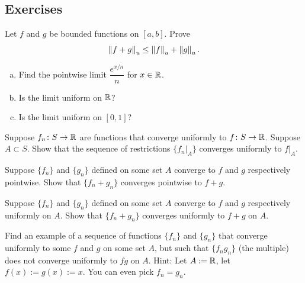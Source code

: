 \subsection{Exercises}

\begin{exercise}
Let $f$ and $g$ be bounded functions on $[a,b]$.  Prove 
\begin{equation*}
\left\lVert {f+g} \right\rVert_u \leq \left\lVert {f} \right\rVert_u + \left\lVert {g} \right\rVert_u .
\end{equation*}
\end{exercise}

\begin{samepage}
\begin{exercise}
\leavevmode
\begin{enumerate}[a)]
\item
Find the pointwise limit $\dfrac{e^{x/n}}{n}$ for $x \in {\mathbb{R}}$.
\item
Is the limit uniform on ${\mathbb{R}}$?
\item
Is the limit uniform on $[0,1]$?
\end{enumerate}
\end{exercise}
\end{samepage}

\begin{exercise}
Suppose $f_n \colon S \to {\mathbb{R}}$ are functions that converge uniformly
to $f \colon S \to {\mathbb{R}}$.  Suppose $A \subset S$.  Show that
the sequence of restrictions $\{ f_n|_A \}$ converges uniformly to $f|_A$.
\end{exercise}

\begin{exercise}
Suppose $\{ f_n \}$ and $\{ g_n \}$ defined on some set $A$ converge to
$f$ and $g$ respectively pointwise.  Show that $\{ f_n+g_n \}$ converges
pointwise to $f+g$.
\end{exercise}

\begin{exercise}
Suppose $\{ f_n \}$ and $\{ g_n \}$ defined on some set $A$ converge to
$f$ and $g$ respectively uniformly on $A$.  Show that $\{ f_n+g_n \}$
converges uniformly to $f+g$ on $A$.
\end{exercise}

\begin{exercise}
Find an example of a sequence of functions $\{ f_n \}$ and $\{ g_n \}$
that converge uniformly to some $f$ and $g$ on some set $A$, but such that
$\{ f_ng_n \}$ (the multiple) does not converge uniformly to $fg$ on $A$.
Hint: Let $A := {\mathbb{R}}$, let $f(x):=g(x) := x$.  You can even pick $f_n = g_n$.
\end{exercise}

